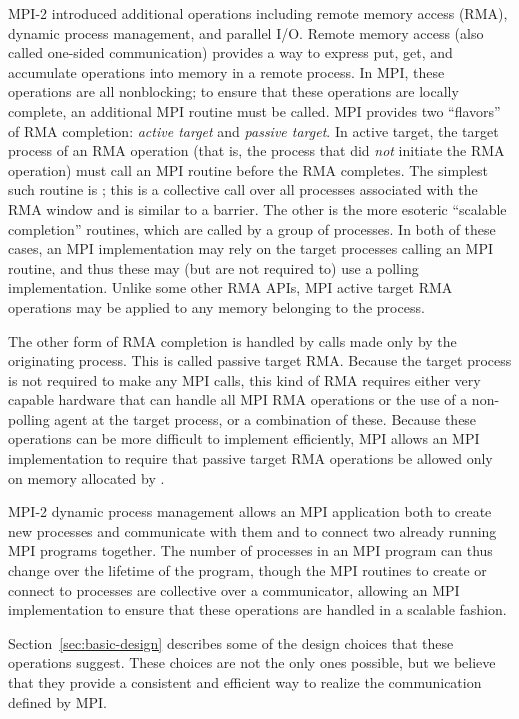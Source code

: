 MPI-2 introduced additional operations including remote memory access (RMA),
dynamic process management, and parallel I/O.  Remote memory
access (also called one-sided communication) provides a way to express
put, get, and accumulate operations into memory in a remote process.
In MPI, these operations are all nonblocking; to ensure that these
operations are locally complete, an additional MPI routine must be
called.  MPI provides two ``flavors'' of RMA completion: \emph{active target}
and \emph{passive target}.  In active target, the target process of an
RMA operation (that is, the process that did \emph{not} initiate the
RMA operation) must call an MPI routine before the RMA completes.  The
simplest such routine is ; this is a collective call over
all 
processes associated with the RMA window and is similar to a barrier.
The other is the more esoteric ``scalable completion'' routines, which
are called by a group of processes.  In both of these cases, an MPI
implementation may rely on the target processes calling an MPI
routine, and thus these may (but are not required to) use a polling
implementation.   Unlike some other RMA APIs, MPI active target
RMA operations may be applied to any memory belonging to the process.

The other form of RMA completion is handled by calls made only by the
originating process.  This is called passive target RMA.  Because the
target process is not required to make any MPI calls, this kind of RMA
requires either very capable hardware that can handle all MPI RMA
operations or the use of a non-polling agent at the target process, or a
combination of these.
Because these operations can be more difficult to implement
efficiently, MPI allows an MPI implementation to require that passive
target RMA operations be allowed only on memory allocated by
.  

MPI-2 dynamic process management allows an MPI application both to
create new processes and communicate with them and to connect two
already running MPI programs together.  The number of processes in an
MPI program can thus change over the lifetime of the program, though
the MPI routines to create or connect to processes are collective over
a communicator, allowing an MPI implementation to ensure that these
operations are handled in a scalable fashion.

Section~\ref{sec:basic-design} describes some of the design choices that these
operations suggest.  These choices are not the only ones possible, but
we believe that they provide a consistent and efficient way to realize
the communication defined by MPI.

